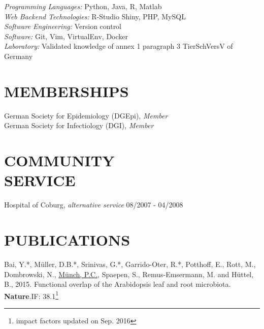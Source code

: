\documentclass[margin, 10pt]{res}
\begin{document}
\begin{resume}
{\sl Programming Languages:} Python, Java, R, Matlab\\
{\sl Web Backend Technologies:} R-Studio Shiny, PHP, MySQL\\
{\sl Software Engineering:} Version control \\
{\sl Software:} Git, Vim, VirtualEnv, Docker\\
{\sl Laboratory:} Validated knowledge of annex 1 paragraph 3 TierSchVersV of Germany
 

\section{MEMBERSHIPS} 

German Society for Epidemiology (DGEpi), {\sl Member}\\
German Society for Infectiology (DGI), {\sl Member} 


\section{COMMUNITY \\ SERVICE}

Hospital of Coburg, {\sl alternative service} \hfill 08/2007 - 04/2008 \\


\section{PUBLICATIONS}
Bai, Y.*, M\"uller, D.B.*, Srinivas, G.*, Garrido-Oter, R.*, Potthoff, E., Rott, M., Dombrowski, N., \underline{M\"unch, P.C.}, Spaepen, S., Remus-Emsermann, M. and H\"uttel, B., 2015. Functional overlap of the Arabidopsis leaf and root microbiota. \textbf{Nature}.\hfill IF:  38.1\footnote[1]{impact factors updated on Sep. 2016}


\end{resume}
\end{document}
